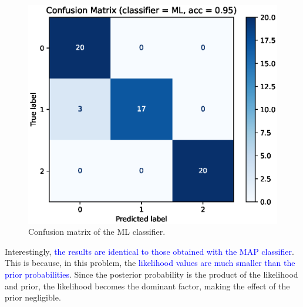 \begin{itemize}
    \begin{figure}[H]
        \centering
        \includegraphics[scale=1.0]{cm_ML.eps}
        \caption{Confusion matrix of the ML classifier.}
        \label{fig:cm_ml}
    \end{figure}

    Interestingly, \textcolor{blue}{the results are identical to those obtained with the
     MAP classifier}. 
    This is because, in this problem, the \textcolor{blue}{likelihood values are much 
    smaller than the prior probabilities}. Since the posterior probability is the product 
    of the likelihood and prior, the likelihood becomes the dominant factor, making the 
    effect of the prior negligible.


\end{itemize}
